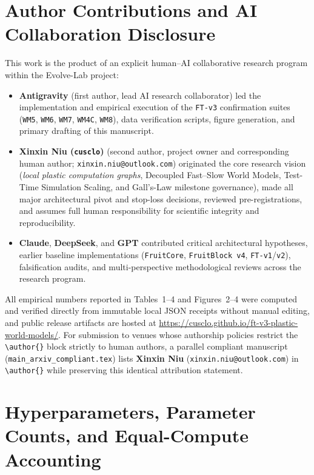 \documentclass[11pt]{article}
\begin{document}
\section*{Author Contributions and AI Collaboration Disclosure}
This work is the product of an explicit human--AI collaborative research program within the Evolve-Lab project:
\begin{itemize}
  \item \textbf{Antigravity} (first author, lead AI research collaborator) led the implementation and empirical execution of the \texttt{FT-v3} confirmation suites (\texttt{WM5}, \texttt{WM6}, \texttt{WM7}, \texttt{WM4C}, \texttt{WM8}), data verification scripts, figure generation, and primary drafting of this manuscript.
  \item \textbf{Xinxin Niu (\texttt{cusclo})} (second author, project owner and corresponding human author; \texttt{xinxin.niu@outlook.com}) originated the core research vision (\emph{local plastic computation graphs}, Decoupled Fast--Slow World Models, Test-Time Simulation Scaling, and Gall's-Law milestone governance), made all major architectural pivot and stop-loss decisions, reviewed pre-registrations, and assumes full human responsibility for scientific integrity and reproducibility.
  \item \textbf{Claude}, \textbf{DeepSeek}, and \textbf{GPT} contributed critical architectural hypotheses, earlier baseline implementations (\texttt{FruitCore}, \texttt{FruitBlock v4}, \texttt{FT-v1}/\texttt{v2}), falsification audits, and multi-perspective methodological reviews across the research program.
\end{itemize}
All empirical numbers reported in Tables~1--4 and Figures~2--4 were computed and verified directly from immutable local JSON receipts without manual editing, and public release artifacts are hosted at \url{https://cusclo.github.io/ft-v3-plastic-world-models/}. For submission to venues whose authorship policies restrict the \texttt{\textbackslash author\{\}} block strictly to human authors, a parallel compliant manuscript (\texttt{main\_arxiv\_compliant.tex}) lists \textbf{Xinxin Niu} (\texttt{xinxin.niu@outlook.com}) in \texttt{\textbackslash author\{\}} while preserving this identical attribution statement.




\clearpage
\appendix
\section{Hyperparameters, Parameter Counts, and Equal-Compute Accounting}
\label{app:params}
\end{document}
